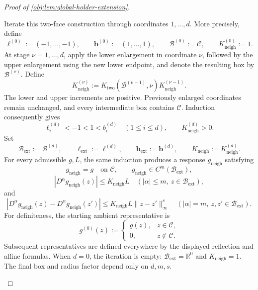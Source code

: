 \begin{proof}[Proof of \cref{obj:lem:global-holder-extension}]
\begin{enumerate}
Iterate this two-face construction through coordinates \(1,\ldots,d\). More precisely, define
\[
\boldsymbol\ell^{(0)}:=(-1,\ldots,-1),
\qquad
\boldsymbol b^{(0)}:=(1,\ldots,1),
\qquad
\mathcal B^{(0)}:=\mathcal C,
\qquad
K_{\mathrm{neigh}}^{(0)}:=1.
\]
At stage \(\nu=1,\ldots,d\), apply the lower enlargement in coordinate \(\nu\), followed by the upper enlargement using the new lower endpoint, and denote the resulting box by \(\mathcal B^{(\nu)}\). Define
\[
K_{\mathrm{neigh}}^{(\nu)}
:=
K_{\mathrm{two}}(\mathcal B^{(\nu-1)},\nu)
K_{\mathrm{neigh}}^{(\nu-1)}.
\]
The lower and upper increments are positive. Previously enlarged coordinates remain unchanged, and every intermediate box contains \(\mathcal C\). Induction consequently gives
\[
\ell_i^{(d)}<-1<1<b_i^{(d)}
\quad(1\le i\le d),
\qquad
K_{\mathrm{neigh}}^{(d)}>0.
\]
Set
\[
\mathcal B_{\mathrm{ext}}
:=\mathcal B^{(d)},
\qquad
\boldsymbol\ell_{\mathrm{ext}}:=\boldsymbol\ell^{(d)},
\qquad
\boldsymbol b_{\mathrm{ext}}:=\boldsymbol b^{(d)},
\qquad
K_{\mathrm{neigh}}:=K_{\mathrm{neigh}}^{(d)}.
\]
For every admissible \(g,L\), the same induction produces a response \(g_{\mathrm{neigh}}\) satisfying
\[
g_{\mathrm{neigh}}=g\quad\text{on }\mathcal C,
\qquad
g_{\mathrm{neigh}}\in C^m(\mathcal B_{\mathrm{ext}}),
\]
\[
|D^\alpha g_{\mathrm{neigh}}(z)|
\le K_{\mathrm{neigh}}L
\quad(|\alpha|\le m,\ z\in\mathcal B_{\mathrm{ext}}),
\]
and
\[
|D^\alpha g_{\mathrm{neigh}}(z)-D^\alpha g_{\mathrm{neigh}}(z')|
\le K_{\mathrm{neigh}}L\|z-z'\|_\infty^s
\quad(|\alpha|=m,\ z,z'\in\mathcal B_{\mathrm{ext}}).
\]
For definiteness, the starting ambient representative is
\[
g^{(0)}(z):=
\begin{cases}
g(z),&z\in\mathcal C,\\
0,&z\notin\mathcal C.
\end{cases}
\]
Subsequent representatives are defined everywhere by the displayed reflection and affine formulas. When \(d=0\), the iteration is empty:
\(\mathcal B_{\mathrm{ext}}=\mathbb R^0\) and \(K_{\mathrm{neigh}}=1\).
The final box and radius factor depend only on \(d,m,s\).


\end{enumerate}
\end{proof}

